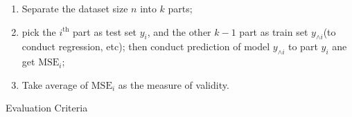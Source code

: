     \begin{enumerate}[topsep=2pt,itemsep=2pt]
        \item Separate the dataset size $ n $ into $ k $ parts;
        \item pick the $ i^\mathrm{th} $ part as test set $ y_i $, and the other $ k-1 $ part as train set $ y_{\wedge i} $(to conduct regression, etc); then conduct prediction of model $ y_{\wedge i} $ to part $ y_i $ ane get $ \mathrm{MSE}_i $;
        \item Take average of $ \mathrm{MSE}_i $ as the measure of validity.
    \end{enumerate}


\begin{point}
    \hypertarget{ModelValidationCriteria}{Evaluation Criteria}
\end{point}

